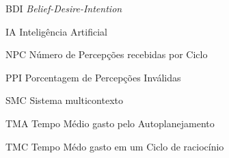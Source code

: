 \begin{siglas}
  \item[ BDI ] \emph{Belief-Desire-Intention}
  \item[ IA ] Inteligência Artificial
  \item[ NPC ] Número de Percepções recebidas por Ciclo 
  \item[ PPI ] Porcentagem de Percepções Inválidas
  \item[ SMC ] Sistema multicontexto
  \item[ TMA ] Tempo Médio gasto pelo Autoplanejamento
  \item[ TMC ] Tempo Médo gasto em um Ciclo de raciocínio
\end{siglas}